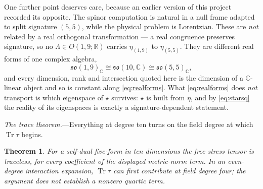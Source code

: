 \documentclass[
  aps,prd,
  reprint,
  letterpaper,
  amsmath,amssymb,
  nofootinbib,
  superscriptaddress
]{revtex4-2}
\theoremstyle{plain}
\newtheorem{theorem}{Theorem}
\begin{document}
One further point deserves care, because an earlier version of this project
recorded its opposite. The spinor computation is natural in a null frame adapted
to split signature $(5,5)$, while the physical problem is Lorentzian. These are
\emph{not} related by a real orthogonal transformation --- a real congruence
preserves signature, so no $\Lambda\in O(1,9;\mathbb{R})$ carries $\eta_{(1,9)}$
to $\eta_{(5,5)}$. They are different real forms of one complex algebra,
\begin{equation}
\mathfrak{so}(1,9)_{\mathbb{C}}\cong\mathfrak{so}(10,\mathbb{C})
\cong\mathfrak{so}(5,5)_{\mathbb{C}},
\label{eq:realforms}
\end{equation}
and every dimension, rank and intersection quoted here is the dimension of a
$\mathbb{C}$-linear object and so is constant along \eqref{eq:realforms}. What
\eqref{eq:realforms} does \emph{not} transport is which eigenspace of $\star$
survives: $\star$ is built from $\eta$, and by \eqref{eq:starsq} the reality of
its eigenspaces is exactly a signature-dependent statement.

\emph{The trace theorem.}---Everything at degree ten turns on the field degree
at which $\operatorname{Tr}\tau$ begins.

\begin{theorem}
\label{thm:gten}
For a self-dual five-form in ten dimensions the free stress tensor is traceless,
for every coefficient of the displayed metric-norm term. In an even-degree
interaction expansion, $\operatorname{Tr}\tau$ can first contribute at field
degree four; the argument does not establish a nonzero quartic term.
\end{theorem}
\end{document}
